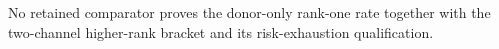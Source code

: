 No retained comparator proves the donor-only rank-one rate together with the two-channel higher-rank bracket and its risk-exhaustion qualification.